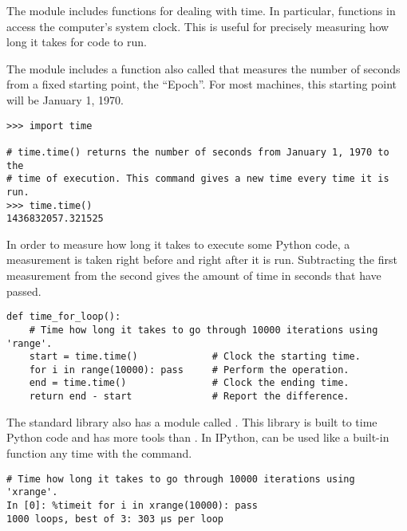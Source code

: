 The  module includes functions for dealing with time.
In particular, functions in  access the computer's system clock.
This is useful for precisely measuring how long it takes for code to run.

The  module includes a function also called  that measures the number of seconds from a fixed starting point, the ``Epoch''.
For most machines, this starting point will be January 1, 1970.

\begin{lstlisting}
>>> import time

# time.time() returns the number of seconds from January 1, 1970 to the
# time of execution. This command gives a new time every time it is run.
>>> time.time()
1436832057.321525
\end{lstlisting}

In order to measure how long it takes to execute some Python code, a measurement is taken right before and right after it is run.
Subtracting the first measurement from the second gives the amount of time in seconds that have passed.

\begin{lstlisting}
def time_for_loop():
    # Time how long it takes to go through 10000 iterations using 'range'.
    start = time.time()             # Clock the starting time.
    for i in range(10000): pass     # Perform the operation.
    end = time.time()               # Clock the ending time.
    return end - start              # Report the difference.
\end{lstlisting}

The standard library also has a module called .
This library is built to time Python code and has more tools than 
.
In IPython,  can be used like a built-in function any time with the  command.

\begin{lstlisting}
# Time how long it takes to go through 10000 iterations using 'xrange'.
In [0]: %timeit for i in xrange(10000): pass 
1000 loops, best of 3: 303 µs per loop
\end{lstlisting}

